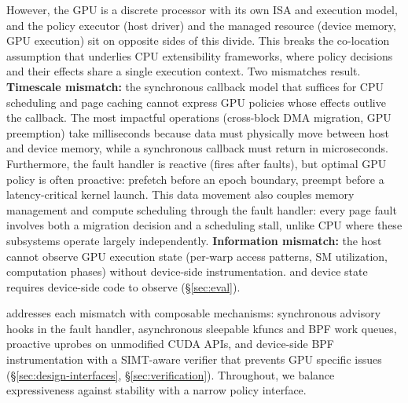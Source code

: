 However, the GPU is a discrete processor with its own ISA and execution model, and the policy executor (host driver) and the managed resource (device memory, GPU execution) sit on opposite sides of this divide. This breaks the co-location assumption that underlies CPU extensibility frameworks, where policy decisions and their effects share a single execution context. Two mismatches result.
\textbf{Timescale mismatch:} the  synchronous callback model that suffices for CPU scheduling and page caching cannot express GPU policies whose effects outlive the callback. The most impactful operations (cross-block DMA migration, GPU preemption) take milliseconds because data must physically move between host and device memory, while a synchronous callback must return in microseconds. Furthermore, the fault handler is reactive (fires after faults), but optimal GPU policy is often proactive: prefetch before an epoch boundary, preempt before a latency-critical kernel launch. This data movement also couples memory management and compute scheduling through the fault handler: every page fault involves both a migration decision and a scheduling stall, unlike CPU where these subsystems operate largely independently.
\textbf{Information mismatch:} the host cannot observe GPU execution state (per-warp access patterns, SM utilization, computation phases) without device-side instrumentation. and device state requires device-side code to observe (\S\ref{sec:eval}).

\sys{} addresses each mismatch with composable mechanisms: synchronous advisory hooks in the fault handler, asynchronous sleepable kfuncs and BPF work queues, proactive uprobes on unmodified CUDA APIs, and device-side BPF instrumentation with a SIMT-aware verifier that prevents GPU specific issues (\S\ref{sec:design-interfaces}, \S\ref{sec:verification}). Throughout, we balance expressiveness against stability with a narrow policy interface.



